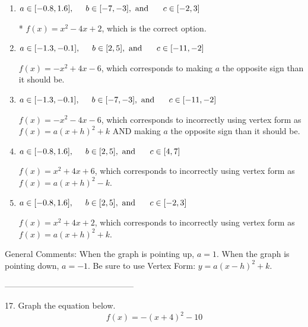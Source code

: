 \documentclass{extbook}[14pt]
\begin{document}
\begin{enumerate}[label=\Alph*.] 
\item $ a \in [-0.8, 1.6], \hspace*{5mm} b \in [-7, -3], \text{ and } \hspace*{5mm} c \in [-2, 3] $ 

 * $f(x)=x^{2} -4 x + 2$, which is the correct option. 
\item $ a \in [-1.3, -0.1], \hspace*{5mm} b \in [2, 5], \text{ and } \hspace*{5mm} c \in [-11, -2] $ 

 $f(x)=-x^{2} +4 x -6$, which corresponds to making $a$ the opposite sign than it should be. 
\item $ a \in [-1.3, -0.1], \hspace*{5mm} b \in [-7, -3], \text{ and } \hspace*{5mm} c \in [-11, -2] $ 

 $f(x)=-x^{2} -4 x -6$, which corresponds to incorrectly using vertex form as $f(x) = a(x+h)^2+k$ AND making $a$ the opposite sign than it should be. 
\item $ a \in [-0.8, 1.6], \hspace*{5mm} b \in [2, 5], \text{ and } \hspace*{5mm} c \in [4, 7] $ 

 $f(x)=x^{2} +4 x + 6$, which corresponds to incorrectly using vertex form as $f(x) = a(x+h)^2 - k$. 
\item $ a \in [-0.8, 1.6], \hspace*{5mm} b \in [2, 5], \text{ and } \hspace*{5mm} c \in [-2, 3] $ 

 $f(x)=x^{2} +4 x + 2$, which corresponds to incorrectly using vertex form as $f(x) = a(x+h)^2+k$. 
\end{enumerate} 
 
General Comments: When the graph is pointing up, $a=1$. When the graph is pointing down, $a=-1$. Be sure to use Vertex Form: $y = a(x-h)^2+k$.

-----------------------------------------------

17. Graph the equation below.
\[ f(x) = -(x+4)^2 - 10 \] 
\end{document}
